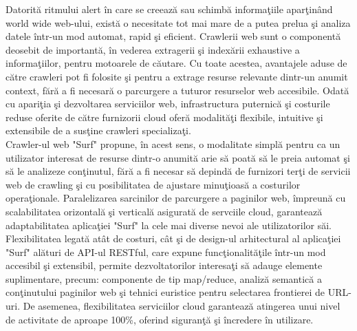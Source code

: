 Datorită ritmului alert în care se creează sau schimbă informaţiile aparţinând world wide web-ului, există o necesitate tot mai mare de a putea prelua şi analiza datele într-un mod automat, rapid şi eficient. Crawlerii web sunt o componentă deosebit de importantă, în vederea extragerii şi indexării exhaustive a informaţiilor, pentru motoarele de căutare. Cu toate acestea, avantajele aduse de către crawleri pot fi folosite şi pentru a extrage resurse relevante dintr-un anumit context, fără a fi necesară o parcurgere a tuturor resurselor web accesibile. Odată cu apariţia şi dezvoltarea serviciilor web, infrastructura puternică şi costurile reduse oferite de către furnizorii cloud oferă modalităţi flexibile, intuitive şi extensibile de a susţine crawleri specializaţi. 
\\

\noindent
Crawler-ul web "Surf" propune, în acest sens, o modalitate simplă pentru ca un utilizator interesat de resurse dintr-o anumită arie să poată să le preia automat şi să le analizeze conţinutul, fără a fi necesar să depindă de furnizori terţi de servicii web de crawling şi cu posibilitatea de ajustare minuţioasă a costurilor operaţionale. Paralelizarea sarcinilor de parcurgere a paginilor web, împreună cu scalabilitatea orizontală şi verticală asigurată de servciile cloud, garantează adaptabilitatea aplicaţiei "Surf" la cele mai diverse nevoi ale utilizatorilor săi. Flexibilitatea legată atât de costuri, cât şi de design-ul arhitectural al aplicaţiei "Surf" alături de API-ul RESTful, care expune funcţionalităţile într-un mod accesibil şi extensibil, permite dezvoltatorilor interesaţi să adauge elemente suplimentare, precum: componente de tip map/reduce, analiză semantică a conţinutului paginilor web şi tehnici euristice pentru selectarea frontierei de URL-uri. De asemenea, flexibilitatea serviciilor cloud garantează atingerea unui nivel de activitate de aproape 100\%, oferind siguranţă şi încredere în utilizare.